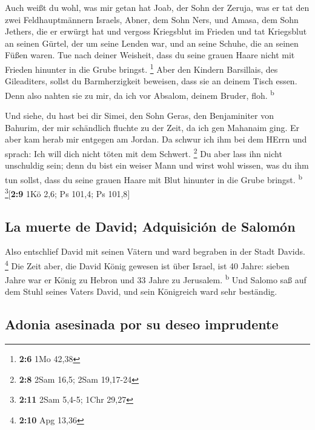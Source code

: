  Auch weißt du wohl, was mir getan hat Joab, der Sohn der
Zeruja, was er tat den zwei Feldhauptmännern Israels, Abner, dem Sohn
Ners, und Amasa, dem Sohn Jethers, die er erwürgt hat und vergoss
Kriegsblut im Frieden und tat Kriegsblut an seinen Gürtel, der um seine
Lenden war, und an seine Schuhe, die an seinen Füßen waren.
 Tue nach deiner Weisheit, dass du seine grauen Haare
nicht mit Frieden hinunter in die Grube bringst. \footnote{\textbf{2:6}
  1Mo 42,38}  Aber den Kindern Barsillais, des
Gileaditers, sollst du Barmherzigkeit beweisen, dass sie an deinem Tisch
essen. Denn also nahten sie zu mir, da ich vor Absalom, deinem Bruder,
floh. \textsuperscript{b}

 Und siehe, du hast bei dir Simei, den Sohn Geras, den
Benjaminiter von Bahurim, der mir schändlich fluchte zu der Zeit, da ich
gen Mahanaim ging. Er aber kam herab mir entgegen am Jordan. Da schwur
ich ihm bei dem HErrn und sprach: Ich will dich nicht töten mit dem
Schwert. \footnote{\textbf{2:8} 2Sam 16,5; 2Sam 19,17-24} 
Du aber lass ihn nicht unschuldig sein; denn du bist ein weiser Mann und
wirst wohl wissen, was du ihm tun sollst, dass du seine grauen Haare mit
Blut hinunter in die Grube bringst. \textsuperscript{b}
\footnote{\textbf{2:11} 2Sam 5,4-5; 1Chr 29,27}{[}\textbf{2:9} 1Kö 2,6;
Ps 101,4; Ps 101,8{]}

\hypertarget{la-muerte-de-david-adquisiciuxf3n-de-salomuxf3n}{%
\subsection{La muerte de David; Adquisición de
Salomón}\label{la-muerte-de-david-adquisiciuxf3n-de-salomuxf3n}}

 Also entschlief David mit seinen Vätern und ward
begraben in der Stadt Davids. \footnote{\textbf{2:10} Apg 13,36}
 Die Zeit aber, die David König gewesen ist über Israel,
ist 40 Jahre: sieben Jahre war er König zu Hebron und 33 Jahre zu
Jerusalem. \textsuperscript{b}  Und Salomo saß auf dem
Stuhl seines Vaters David, und sein Königreich ward sehr beständig.

\hypertarget{adonia-asesinada-por-su-deseo-imprudente}{%
\subsection{Adonia asesinada por su deseo
imprudente}\label{adonia-asesinada-por-su-deseo-imprudente}}


